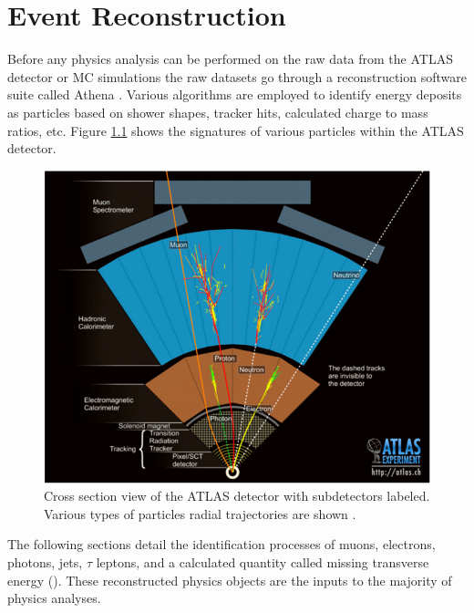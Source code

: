 \chapter{Event Reconstruction}\label{chap:reco}
	Before any physics analysis can be performed on the raw data from the \gls{ATLAS} detector or \gls{MC} simulations the raw datasets go through a reconstruction software suite called Athena \cite{athena}. Various algorithms are employed to identify energy deposits as particles based on shower shapes, tracker hits, calculated charge to mass ratios, etc. Figure \ref{fig:ATLAS-XSec} shows the signatures of various particles within the \gls{ATLAS} detector. 

	\begin{figure}[!ht]
	\centering
	\includegraphics[width=.65\textwidth,keepaspectratio=true]{chapters/chapter3_experiment/images/ATLASCrossSectionDiagram.png}
	\caption{ Cross section view of the \gls{ATLAS} detector with subdetectors labeled. Various types of particles radial trajectories are shown \cite{atlas-experiment}.}
	\label{fig:ATLAS-XSec}
	\end{figure}

	The following sections detail the identification processes of muons, electrons, photons, jets, $\tau$ leptons, and a calculated quantity called missing transverse energy (\Etm). These reconstructed physics objects are the inputs to the majority of physics analyses.

